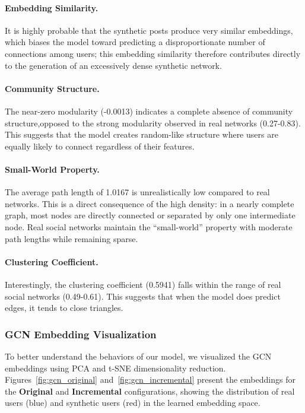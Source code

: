 \paragraph{Embedding Similarity.} It is highly probable that the synthetic posts produce very similar embeddings, which biases the model toward predicting a disproportionate number of connections among users; this embedding similarity therefore contributes directly to the generation of an excessively dense synthetic network.

\paragraph{Community Structure.} The near-zero modularity (-0.0013) indicates a complete absence of community structure,opposed to the strong modularity observed in real networks (0.27-0.83). This suggests that the model creates random-like structure where users are equally likely to connect regardless of their features.

\paragraph{Small-World Property.} The average path length of 1.0167 is unrealistically low compared to real networks. This is a direct consequence of the high density: in a nearly complete graph, most nodes are directly connected or separated by only one intermediate node. Real social networks maintain the ``small-world'' property with moderate path lengths while remaining sparse.

\paragraph{Clustering Coefficient.} Interestingly, the clustering coefficient (0.5941) falls within the range of real social networks (0.49-0.61). This suggests that when the model does predict edges, it tends to close triangles.

\subsubsection*{GCN Embedding Visualization}

To better understand the behaviors of our model, we visualized the GCN embeddings using PCA and t-SNE dimensionality reduction. Figures~\ref{fig:gcn_original} and~\ref{fig:gcn_incremental} present the embeddings for the \textcolor{drawred}{\textbf{Original}} and \textcolor{drawblue}{\textbf{Incremental}} configurations, showing the distribution of real users (blue) and synthetic users (red) in the learned embedding space.

